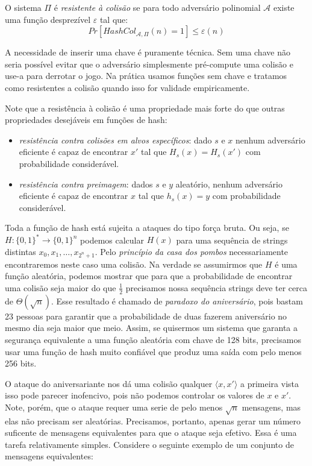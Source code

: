 O sistema $\Pi$ é {\em resistente à colisão} \cite{Damgard88} se para todo adversário polinomial $\mathcal{A}$ existe uma função desprezível $\varepsilon$ tal que:
\begin{displaymath}
  Pr[HashCol_{\mathcal{A}, \Pi}(n) = 1] \leq \varepsilon(n)
\end{displaymath}

A necessidade de inserir uma chave é puramente técnica.
Sem uma chave não seria possível evitar que o adversário simplesmente pré-compute uma colisão e use-a para derrotar o jogo.
Na prática usamos funções sem chave e tratamos como resistentes a colisão quando isso for validade empiricamente.

Note que a resistência à colisão é uma propriedade mais forte do que outras propriedades desejáveis em funções de hash:
\begin{itemize}
\item {\em resistência contra colisões em alvos específicos}: dado $s$ e $x$ nenhum adversário eficiente é capaz de encontrar $x'$ tal que $H_s(x) = H_s(x')$ com probabilidade considerável.
\item {\em resistência contra preimagem}: dados $s$ e $y$ aleatório, nenhum adversário eficiente é capaz de encontrar $x$ tal que $h_s(x) = y$ com probabilidade considerável. 
\end{itemize}

Toda a função de hash está sujeita a ataques do tipo força bruta.
Ou seja, se $H: \{0,1\}^* \to \{0,1\}^n$ podemos calcular $H(x)$ para uma sequência de strings distintas $x_0, x_1, \dots, x_{2^n+1}$.
Pelo {\em princípio da casa dos pombos} necessariamente encontraremos neste caso uma colisão.
Na verdade se assumirmos que $H$ é uma função aleatória, podemos mostrar que para que a probabilidade de encontrar uma colisão seja maior do que $\frac{1}{2}$ precisamos nossa sequência strings deve ter cerca de $\Theta(\sqrt{n})$.
Esse resultado é chamado de {\em paradoxo do aniversário}, pois bastam 23 pessoas para garantir que a probabilidade de duas fazerem aniversário no mesmo dia seja maior que meio.
Assim, se quisermos um sistema que garanta a segurança equivalente a uma função aleatória com chave de 128 bits, precisamos usar uma função de hash muito confiável que produz uma saída com pelo menos 256 bits.

O ataque do aniversariante nos dá uma colisão qualquer $\langle x, x' \rangle$ a primeira vista isso pode parecer inofencivo, pois não podemos controlar os valores de $x$ e  $x'$.
Note, porém, que o ataque requer uma serie de pelo menos $\sqrt{n}$ mensagens, mas elas não precisam ser aleatórias.
Precisamos, portanto, apenas gerar um número suficente de mensagens equivalentes para que o ataque seja efetivo.
Essa é uma tarefa relativamente simples.
Considere o seguinte exemplo de um conjunto de mensagens equivalentes:


